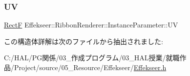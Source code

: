 \subsubsection{\texorpdfstring{UV}{UV}}
{\footnotesize\ttfamily \mbox{\hyperlink{struct_effekseer_1_1_rect_f}{RectF}} Effekseer\+::\+Ribbon\+Renderer\+::\+Instance\+Parameter\+::\+UV}



この構造体詳解は次のファイルから抽出されました\+:\begin{DoxyCompactItemize}
\item 
C\+:/\+H\+A\+L/\+P\+G関係/03\+\_\+作成プログラム/03\+\_\+\+H\+A\+L授業/就職作品/\+Project/source/05\+\_\+\+Resource/\+Effekseer/\mbox{\hyperlink{_effekseer_8h}{Effekseer.\+h}}\end{DoxyCompactItemize}
